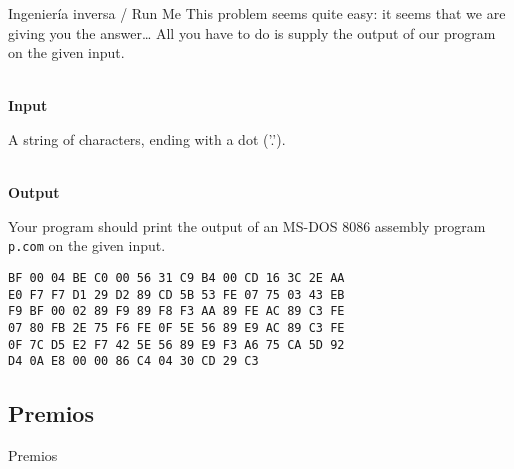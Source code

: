 \begin{frame}[fragile]{Ingeniería inversa / Run Me}
    This problem seems quite easy: it seems that we are giving you the answer…
    All you have to do is supply the output of our program on the given input. \\~
    
    \textbf{Input}

    A string of characters, ending with a dot ('.'). \\~
    
    \textbf{Output}

    Your program should print the output of an MS-DOS 8086 assembly program
    \texttt{p.com} on the given input.
    
    \begin{lstlisting}
BF 00 04 BE C0 00 56 31 C9 B4 00 CD 16 3C 2E AA
E0 F7 F7 D1 29 D2 89 CD 5B 53 FE 07 75 03 43 EB
F9 BF 00 02 89 F9 89 F8 F3 AA 89 FE AC 89 C3 FE
07 80 FB 2E 75 F6 FE 0F 5E 56 89 E9 AC 89 C3 FE
0F 7C D5 E2 F7 42 5E 56 89 E9 F3 A6 75 CA 5D 92
D4 0A E8 00 00 86 C4 04 30 CD 29 C3
    \end{lstlisting}
\end{frame}

\subsection{Premios}
\begin{frame}{Premios}
\end{frame}

